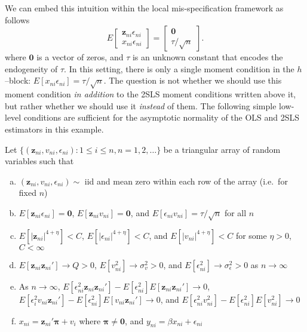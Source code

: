 We can embed this intuition within the local mis-specification framework as follows
  \begin{equation}
     E \left[\begin{array}{c} \mathbf{z}_{ni} \epsilon_{ni} \\ x_{ni} \epsilon_{ni} \end{array}\right] = \left[\begin{array}{c} \mathbf{0} \\ \tau/\sqrt{n} \end{array}\right].
  \end{equation}
where $\mathbf{0}$ is a vector of zeros, and $\tau$ is an unknown constant that encodes the endogeneity of $\tau$. 
In this setting, there is only a single moment condition in the $h$--block: $E[x_{ni}\epsilon_{ni}] = \tau/\sqrt{n}$. 
The question is not whether we should use this moment condition \emph{in addition} to the 2SLS moment conditions written above it, but rather whether we should use it \emph{instead} of them.
The following simple low-level conditions are sufficient for the asymptotic normality of the OLS and 2SLS estimators in this example.

\begin{assump}\label{assump:OLSvsIV}
	Let $\{(\mathbf{z}_{ni}, v_{ni}, \epsilon_{ni})\colon 1\leq i \leq n, n = 1, 2, \hdots\}$ be a triangular array of random variables such that
	\begin{enumerate}[(a)]
		\item $(\mathbf{z}_{ni}, v_{ni}, \epsilon_{ni}) \sim$ iid and mean zero within each row of the array (i.e.\ for fixed $n$)
		\item $E[\mathbf{z}_{ni} \epsilon_{ni}]=\mathbf{0}$, $E[\mathbf{z}_{ni} v_{ni}]=\mathbf{0}$, and $E[\epsilon_{ni}v_{ni}] = \tau/\sqrt{n}$ for all $n$
		\item $E[\left|\mathbf{z}_{ni}\right|^{4+\eta}] <C$, $E[\left|\epsilon_{ni}\right|^{4+\eta}] <C$, and $E[\left|v_{ni}\right|^{4+\eta}] <C$ for some $\eta >0$, $C <\infty$
		\item $E[\mathbf{z}_{ni} \mathbf{z}_{ni}'] \rightarrow Q>0$, $E[v_{ni}^2]\rightarrow \sigma_v^2 >0$, and $E[\epsilon_{ni}^2] \rightarrow \sigma_\epsilon^2 >0$ as $n\rightarrow \infty$
		\item As $n\rightarrow \infty$, $E[\epsilon_{ni}^2 \mathbf{z}_{ni} \mathbf{z}_{ni}']- E[\epsilon_{ni}^2]E[ \mathbf{z}_{ni} \mathbf{z}_{ni}'] \rightarrow 0$, $E[\epsilon_i^2 v_{ni} \mathbf{z}_{ni}'] - E[\epsilon_{ni}^2]E[v_{ni} \mathbf{z}_{ni}'] \rightarrow 0$, and $E[\epsilon_{ni}^2 v_{ni}^2] - E[\epsilon_{ni}^2]E[v_{ni}^2] \rightarrow 0$
		\item $x_{ni} = \mathbf{z}_{ni}'\boldsymbol{\pi} + v_i$ where $\boldsymbol{\pi} \neq \mathbf{0}$, and $y_{ni} = \beta x_{ni} + \epsilon_{ni}$
	\end{enumerate}
\end{assump}

